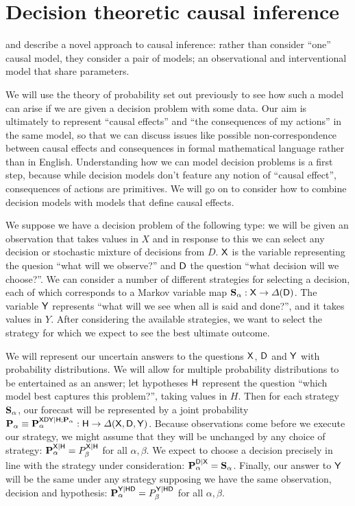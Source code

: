 
\section{Decision theoretic causal inference}\label{sec:seedo_models}

\citet{lattimore_causal_2019} and \citet{lattimore_replacing_2019} describe a novel approach to causal inference: rather than consider ``one'' causal model, they consider a pair of models; an observational and interventional model that share parameters.

We will use the theory of probability set out previously to see how such a model can arise if we are given a decision problem with some data. Our aim is ultimately to represent ``causal effects'' and ``the consequences of my actions'' in the same model, so that we can discuss issues like possible non-correspondence between causal effects and consequences in formal mathematical language rather than in English. Understanding how we can model decision problems is a first step, because while decision models don't feature any notion of ``causal effect'', consequences of actions are primitives. We will go on to consider how to combine decision models with models that define causal effects.

We suppose we have a decision problem of the following type: we will be given an observation that takes values in $X$ and in response to this we can select any decision or stochastic mixture of decisions from $D$. $\mathsf{X}$ is the variable representing the quesion ``what will we observe?'' and $\mathsf{D}$ the question ``what decision will we choose?''. We can consider a number of different strategies for selecting a decision, each of which corresponds to a Markov variable map $\mathbf{S}_\alpha:\mathsf{X}\to \Delta(\mathsf{D})$.  The variable $\mathsf{Y}$ represents ``what will we see when all is said and done?'', and it takes values in $Y$. After considering the available strategies, we want to select the strategy for which we expect to see the best ultimate outcome.

We will represent our uncertain answers to the questions $\mathsf{X}$, $\mathsf{D}$ and $\mathsf{Y}$ with probability distributions. We will allow for multiple probability distributions to be entertained as an answer; let hypotheses $\mathsf{H}$ represent the question ``which model best captures this problem?'', taking values in $H$. Then for each strategy $\mathbf{S}_\alpha$, our forecast will be represented by a joint probability $\mathbf{P}_{\alpha}\equiv\mathbf{P}_\alpha^{\mathsf{XDY}|\mathsf{H};\mathbf{P}_\alpha}:\mathsf{H}\to\Delta(\mathsf{X},\mathsf{D},\mathsf{Y})$. Because observations come before we execute our strategy, we might assume that they will be unchanged by any choice of strategy: $\mathbf{P}_{\alpha}^{\mathsf{X}|\mathsf{H}}=P_{\beta}^{\mathsf{X}|\mathsf{H}}$ for all $\alpha,\beta$. We expect to choose a decision precisely in line with the strategy under consideration: $\mathbf{P}_{\alpha}^{\mathsf{D}|\mathsf{X}}=\mathbf{S}_\alpha$. Finally, our answer to $\mathsf{Y}$ will be the same under any strategy supposing we have the same observation, decision and hypothesis: $\mathbf{P}_{\alpha}^{\mathsf{Y}|\mathsf{HD}}=P_{\beta}^{\mathsf{Y}|\mathsf{HD}}$ for all $\alpha,\beta$.

